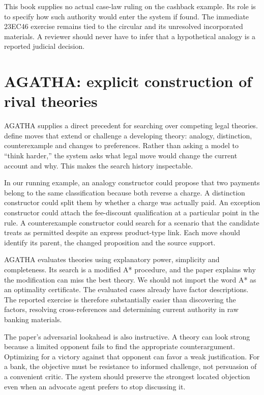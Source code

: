 \documentclass[12pt,a4paper,oneside,openany]{book}
\begin{document}
This book supplies no actual case-law ruling on the cashback example. Its role is
to specify how such authority would enter the system if found. The immediate
23EC46 exercise remains tied to the circular and its unresolved incorporated
materials. A reviewer should never have to infer that a hypothetical analogy is
a reported judicial decision.

\section{AGATHA: explicit construction of rival theories}

AGATHA supplies a direct precedent for searching over competing legal theories.
\citet[sections 2--4]{agatha2005} define moves that extend or challenge a developing
theory: analogy, distinction, counterexample and changes to preferences. Rather
than asking a model to ``think harder,'' the system asks what legal move would
change the current account and why. This makes the search history inspectable.

In our running example, an analogy constructor could propose that two payments
belong to the same classification because both reverse a charge. A distinction
constructor could split them by whether a charge was actually paid. An exception
constructor could attach the fee-discount qualification at a particular point in
the rule. A counterexample constructor could search for a scenario that the
candidate treats as permitted despite an express product-type link. Each move
should identify its parent, the changed proposition and the source support.

AGATHA evaluates theories using explanatory power, simplicity and completeness.
Its search is a modified A* procedure, and the paper explains why the modification
can miss the best theory. We should not import the word A* as an optimality
certificate. The evaluated cases already have factor descriptions. The reported
exercise is therefore substantially easier than discovering the factors,
resolving cross-references and determining current authority in raw banking
materials.

The paper's adversarial lookahead is also instructive. A theory can look strong
because a limited opponent fails to find the appropriate counterargument.
Optimizing for a victory against that opponent can favor a weak justification.
For a bank, the objective must be resistance to informed challenge, not persuasion
of a convenient critic. The system should preserve the strongest located
objection even when an advocate agent prefers to stop discussing it.
\end{document}
